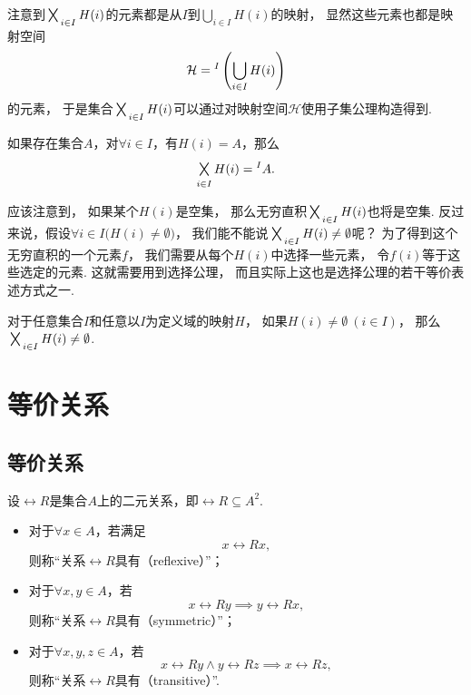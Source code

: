 注意到\(\BigTimes_{i \in I} H(i)\)的元素都是从\(I\)到\(\bigcup_{i \in I} H(i)\)的映射，
显然这些元素也都是映射空间\[
	\mathcal{H} = \vphantom{.}^I\left(\bigcup_{i \in I} H(i)\right)
\]的元素，
于是集合\(\BigTimes_{i \in I} H(i)\)可以通过对映射空间\(\mathcal{H}\)使用子集公理构造得到.

\begin{example}
如果存在集合\(A\)，对\(\forall i \in I\)，有\(H(i) = A\)，那么\[
	\BigTimes_{i \in I} H(i) = \vphantom{.}^IA.
\]
\end{example}

应该注意到，
如果某个\(H(i)\)是空集，
那么无穷直积\(\BigTimes_{i \in I} H(i)\)也将是空集.
反过来说，假设\(\forall i \in I \bigl( H(i) \neq \emptyset \bigr)\)，
我们能不能说\(\BigTimes_{i \in I} H(i) \neq \emptyset\)呢？
为了得到这个无穷直积的一个元素\(f\)，
我们需要从每个\(H(i)\)中选择一些元素，
令\(f(i)\)等于这些选定的元素.
这就需要用到选择公理，
而且实际上这也是选择公理的若干等价表述方式之一.

\begin{axiom}
对于任意集合\(I\)和任意以\(I\)为定义域的映射\(H\)，
如果\(H(i) \neq \emptyset\ (i \in I)\)，
那么\(\BigTimes_{i \in I} H(i) \neq \emptyset\).
\end{axiom}

\section{等价关系}
\subsection{等价关系}
\begin{definition}
设\(\rel{R}\)是集合\(A\)上的二元关系，即\(\rel{R} \subseteq A^2\).
\begin{itemize}
	\item 对于\(\forall x \in A\)，若满足\[
		x\rel{R}x,
	\]
	则称“关系\(\rel{R}\)具有（reflexive）”；

	\item 对于\(\forall x,y \in A\)，若\[
		x\rel{R}y \implies y\rel{R}x,
	\]
	则称“关系\(\rel{R}\)具有（symmetric）”；

	\item 对于\(\forall x,y,z \in A\)，若\[
		x\rel{R}y \land y\rel{R}z \implies x\rel{R}z,
	\]
	则称“关系\(\rel{R}\)具有（transitive）”.
\end{itemize}
\end{definition}

